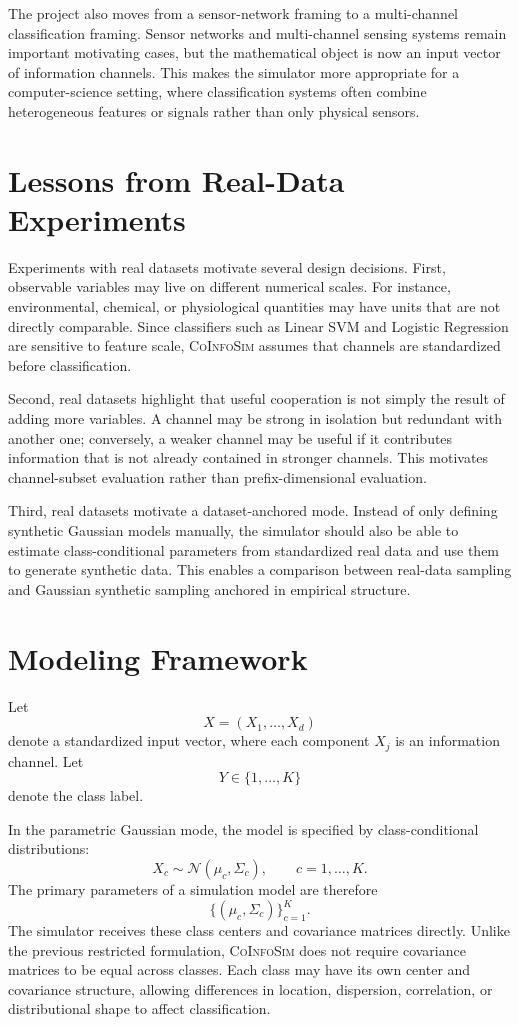 \documentclass[11pt,a4paper]{article}
\newcommand{\CoInfoSim}{\textsc{CoInfoSim}}
\begin{document}
The project also moves from a sensor-network framing to a multi-channel classification framing. Sensor networks and multi-channel sensing systems remain important motivating cases, but the mathematical object is now an input vector of information channels. This makes the simulator more appropriate for a computer-science setting, where classification systems often combine heterogeneous features or signals rather than only physical sensors.

\section{Lessons from Real-Data Experiments}

Experiments with real datasets motivate several design decisions. First, observable variables may live on different numerical scales. For instance, environmental, chemical, or physiological quantities may have units that are not directly comparable. Since classifiers such as Linear SVM and Logistic Regression are sensitive to feature scale, \CoInfoSim{} assumes that channels are standardized before classification.

Second, real datasets highlight that useful cooperation is not simply the result of adding more variables. A channel may be strong in isolation but redundant with another one; conversely, a weaker channel may be useful if it contributes information that is not already contained in stronger channels. This motivates channel-subset evaluation rather than prefix-dimensional evaluation.

Third, real datasets motivate a dataset-anchored mode. Instead of only defining synthetic Gaussian models manually, the simulator should also be able to estimate class-conditional parameters from standardized real data and use them to generate synthetic data. This enables a comparison between real-data sampling and Gaussian synthetic sampling anchored in empirical structure.

\section{Modeling Framework}

Let
\[
    X=(X_1,\ldots,X_d)
\]
denote a standardized input vector, where each component $X_j$ is an information channel. Let
\[
    Y\in\{1,\ldots,K\}
\]
denote the class label.

In the parametric Gaussian mode, the model is specified by class-conditional distributions:
\[
    X_c \sim \mathcal{N}(\mu_c,\Sigma_c),
    \qquad c=1,\ldots,K.
\]
The primary parameters of a simulation model are therefore
\[
    \{(\mu_c,\Sigma_c)\}_{c=1}^{K}.
\]
The simulator receives these class centers and covariance matrices directly. Unlike the previous restricted formulation, \CoInfoSim{} does not require covariance matrices to be equal across classes. Each class may have its own center and covariance structure, allowing differences in location, dispersion, correlation, or distributional shape to affect classification.
\end{document}
